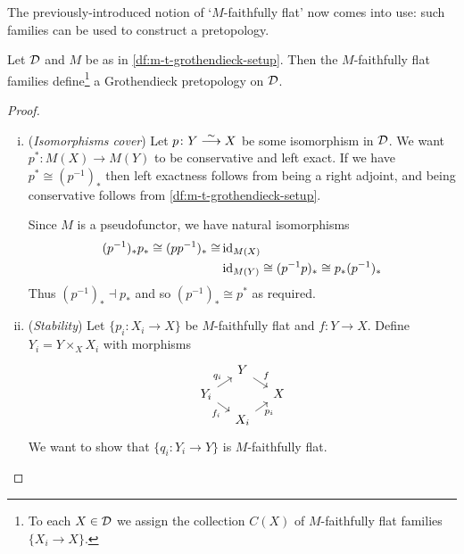         The previously-introduced notion of `$M$-faithfully flat' now comes into use: such families can be used to construct a pretopology.

        \begin{lemma}[(Proposition~2.4, \S2.1, p.9)]\label{le:m-t-grothendieck-pretopology}
            Let $\mathcal{D}$ and $M$ be as in \cref{df:m-t-grothendieck-setup}.
            Then the $M$-faithfully flat families define\footnote{
                To each $X\in\mathcal{D}$ we assign the collection $C(X)$ of $M$-faithfully flat families $\{X_i\to X\}$.
            } a Grothendieck pretopology on $\mathcal{D}$.
        \end{lemma}

        \begin{proof}
            \mbox{}
            \begin{enumerate}[(i)]
                \item (\emph{Isomorphisms cover})
                    Let $p\colon Y\overset{\sim}{\longrightarrow} X$ be some isomorphism in $\mathcal{D}$.
                    We want $p^*\colon M(X)\to M(Y)$ to be conservative and left exact.
                    If we have $p^*\cong(p^{-1})_*$ then left exactness follows from being a right adjoint, and being conservative follows from \cref{df:m-t-grothendieck-setup}.

                    Since $M$ is a pseudofunctor, we have natural isomorphisms
                    \begin{align*}
                        (p^{-1})_*p_*\cong(pp^{-1})_*\cong&\operatorname{id}_{M(X)}\\
                        &\operatorname{id}_{M(Y)}\cong(p^{-1}p)_*\cong p_*(p^{-1})_*
                    \end{align*}
                    Thus $(p^{-1})_*\dashv p_*$ and so $(p^{-1})_*\cong p^*$ as required.
                \item (\emph{Stability})
                    Let $\{p_i\colon X_i\to X\}$ be $M$-faithfully flat and $f\colon Y\to X$.
                    Define $Y_i=Y\times_X X_i$ with morphisms
                    \begin{equation*}
                        \begin{tikzcd}[column sep=1em, row sep=.5em]
                            & Y \arrow[dr, "f"] &\\
                            Y_i \arrow[ur, "q_i"] \arrow[dr, swap, "f_i"] & & X\\
                            & X_i \arrow[ur, swap, "p_i"] &
                        \end{tikzcd}
                    \end{equation*}
                    We want to show that $\{q_i\colon Y_i\to Y\}$ is $M$-faithfully flat.


\end{enumerate}
\end{proof}
